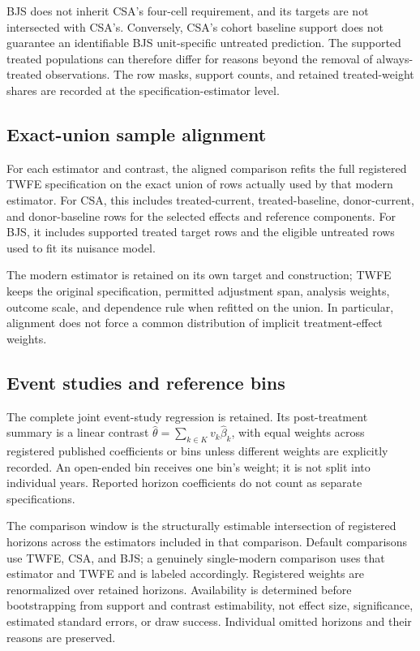 \documentclass[11pt,letterpaper]{article}
\begin{document}
BJS does not inherit CSA's four-cell requirement, and its targets are not intersected with CSA's. Conversely, CSA's cohort baseline support does not guarantee an identifiable BJS unit-specific untreated prediction. The supported treated populations can therefore differ for reasons beyond the removal of always-treated observations. The row masks, support counts, and retained treated-weight shares are recorded at the specification-estimator level.

\subsection{Exact-union sample alignment}
For each estimator and contrast, the aligned comparison refits the full registered TWFE specification on the exact union of rows actually used by that modern estimator. For CSA, this includes treated-current, treated-baseline, donor-current, and donor-baseline rows for the selected effects and reference components. For BJS, it includes supported treated target rows and the eligible untreated rows used to fit its nuisance model. 

The modern estimator is retained on its own target and construction; TWFE keeps the original specification, permitted adjustment span, analysis weights, outcome scale, and dependence rule when refitted on the union. In particular, alignment does not force a common distribution of implicit treatment-effect weights. 

\subsection{Event studies and reference bins}
The complete joint event-study regression is retained. Its post-treatment summary is a linear contrast $\hat\theta=\sum_{k\in K}v_k\hat\beta_k$, with equal weights across registered published coefficients or bins unless different weights are explicitly recorded. An open-ended bin receives one bin's weight; it is not split into individual years. Reported horizon coefficients do not count as separate specifications.

The comparison window is the structurally estimable intersection of registered horizons across the estimators included in that comparison. Default comparisons use TWFE, CSA, and BJS; a genuinely single-modern comparison uses that estimator and TWFE and is labeled accordingly. Registered weights are renormalized over retained horizons. Availability is determined before bootstrapping from support and contrast estimability, not effect size, significance, estimated standard errors, or draw success. Individual omitted horizons and their reasons are preserved.
\end{document}
